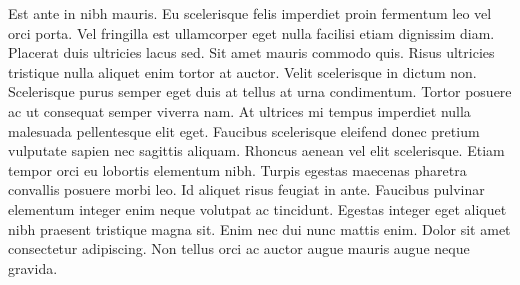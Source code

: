 \documentclass{article}
\begin{document}
Est ante in nibh mauris. Eu scelerisque felis imperdiet proin fermentum
leo vel orci porta. Vel fringilla est ullamcorper eget nulla facilisi
etiam dignissim diam. Placerat duis ultricies lacus sed. Sit amet mauris
commodo quis. Risus ultricies tristique nulla aliquet enim tortor at
auctor. Velit scelerisque in dictum non. Scelerisque purus semper eget
duis at tellus at urna condimentum. Tortor posuere ac ut consequat semper
viverra nam. At ultrices mi tempus imperdiet nulla malesuada pellentesque
elit eget. Faucibus scelerisque eleifend donec pretium vulputate sapien
nec sagittis aliquam. Rhoncus aenean vel elit scelerisque. Etiam tempor
orci eu lobortis elementum nibh. Turpis egestas maecenas pharetra
convallis posuere morbi leo. Id aliquet risus feugiat in ante. Faucibus
pulvinar elementum integer enim neque volutpat ac tincidunt. Egestas
integer eget aliquet nibh praesent tristique magna sit. Enim nec dui nunc
mattis enim. Dolor sit amet consectetur adipiscing. Non tellus orci ac
auctor augue mauris augue neque gravida.
\end{document}
